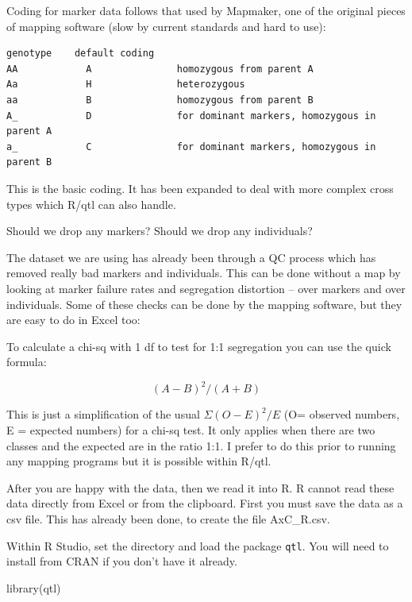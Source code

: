 \documentclass[
]{book}
\newenvironment{Shaded}{\begin{snugshade}}{\end{snugshade}}
\newcommand{\FunctionTok}[1]{\textcolor[rgb]{0.00,0.00,0.00}{#1}}
\newcommand{\NormalTok}[1]{#1}
\begin{document}
Coding for marker data follows that used by Mapmaker, one of the original pieces of
mapping software (slow by current standards and hard to use):

\begin{verbatim}
genotype    default coding  
AA            A               homozygous from parent A 
Aa            H               heterozygous 
aa            B               homozygous from parent B 
A_            D               for dominant markers, homozygous in parent A 
a_            C               for dominant markers, homozygous in parent B
\end{verbatim}

This is the basic coding. It has been expanded to deal with more complex cross types which R/qtl can also handle.

Should we drop any markers? Should we drop any individuals?

The dataset we are using has already been through a QC process which has removed really bad markers and individuals. This can be done without a map by looking at marker failure rates and segregation distortion -- over markers and over individuals. Some of these checks can be done by the mapping software, but they are easy to do in Excel too:

To calculate a chi-sq with 1 df to test for 1:1 segregation you can use the quick formula:

\[(A-B)^2/(A+B)\]

This is just a simplification of the usual \(Σ(O-E)^2/E\) (O= observed numbers, E = expected numbers) for a chi-sq test. It only applies when there are two classes and the expected are in the ratio 1:1. I prefer to do this prior to running any mapping programs but it is possible within R/qtl.

After you are happy with the data, then we read it into R. R cannot read these data directly from Excel or from the clipboard. First you must save the data as a csv file. This has already been done, to create the file AxC\_R.csv.

Within R Studio, set the directory and load the package \texttt{qtl}. You will need to install from CRAN if you don't have it already.

\begin{Shaded}
\begin{Highlighting}[]
\FunctionTok{library}\NormalTok{(qtl)}
\end{Highlighting}
\end{Shaded}
\end{document}
